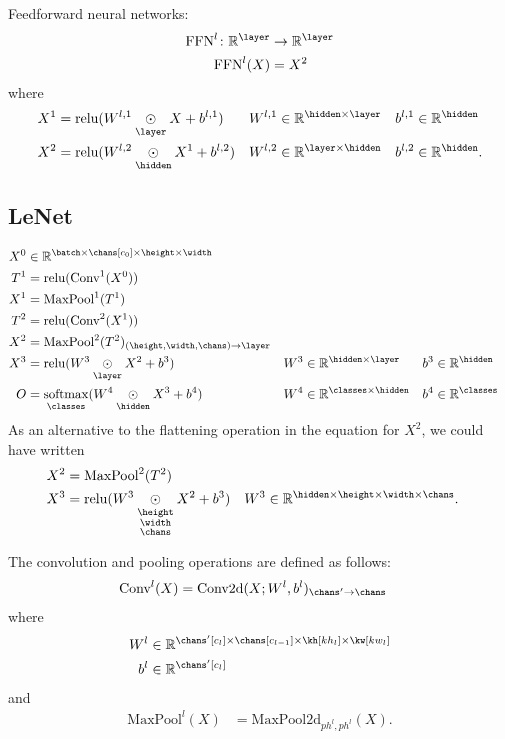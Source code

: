 \documentclass{article}
\newcommand{\reals}{\mathbb{R}}
\begin{document}
Feedforward neural networks:
\begin{align*}
  \text{FFN}^l \colon \mathbb{R}^{\layer} &\rightarrow \mathbb{R}^{\layer} \\
  \text{FFN}^l(X) &= X^2
\end{align*}
where
\begin{align*}
  X^1 &= \text{relu}(W^{l,1} \ndot{\layer} X + b^{l,1}) & W^{l,1} &\in \mathbb{R}^{\hidden \times \layer} & b^{l,1} &\in \mathbb{R}^{\hidden} \\
  X^2 &= \text{relu}(W^{l,2} \ndot{\hidden} X^1 + b^{l,2}) & W^{l,2} &\in \mathbb{R}^{\layer \times \hidden} & b^{l,2} &\in \mathbb{R}^{\hidden}.
\end{align*}

\subsection{LeNet}

\begin{align*}
X^0 &\in \reals^{\batch \times \chans[c_0] \times \height \times \width} \\
T^1 &= \text{relu}(\text{Conv}^1(X^0)) \\
X^1 &= \text{MaxPool}^1(T^1) \\
T^2 &= \text{relu}(\text{Conv}^2(X^1)) \\
X^2 &= \text{MaxPool}^2(T^2)_{(\height,\width,\chans)\rightarrow\layer} \\
X^3 &= \text{relu}(W^3 \ndot{\layer} X^2 + b^3) & W^3 &\in \mathbb{R}^{\hidden \times \layer} & b^3 &\in \mathbb{R}^{\hidden} \\
O &= \nfun{\classes}{softmax} (W^4 \ndot{\hidden} X^3 + b^4) & W^4 &\in \mathbb{R}^{\classes \times \hidden} & b^4 &\in \mathbb{R}^{\classes}
\end{align*}
As an alternative to the flattening operation in the equation for $X^2$, we could have written
\begin{align*}
X^2 &= \text{MaxPool}^2(T^2) \\
X^3 &= \text{relu}(W^3 \ndot{\height \\ \width \\ \chans} X^2 + b^3) & W^3 &\in \mathbb{R}^{\hidden \times \height \times \width \times \chans}.
\end{align*}

The convolution and pooling operations are defined as follows:
\begin{align*}
\text{Conv}^l(X) &= \text{Conv2d}(X; W^l, b^l)_{\chans'\rightarrow\chans}
\end{align*}
where
\begin{align*}
W^l & \in \reals^{\chans'[c_l] \times \chans[c_{l-1}] \times \kh[kh_l] \times \kw[kw_l]} \\
b^l &\in \reals^{\chans'[c_l]}
\end{align*}
and
\begin{align*}
\text{MaxPool}^l(X) &= \text{MaxPool2d}_{ph^l,ph^l}(X).
\end{align*}
\end{document}
